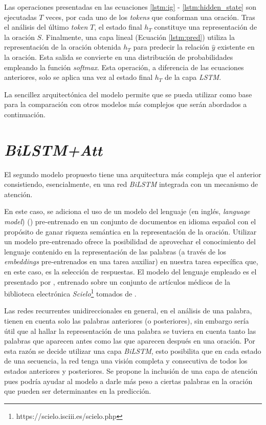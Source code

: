 Las operaciones presentadas en las ecuaciones \ref{lstm:ig} - \ref{lstm:hidden_state} son ejecutadas $T$ veces, por cada uno de los \textit{tokens} que conforman una oración. Tras el análisis del último \textit{token} $T$, el estado final $h_{T}$ constituye una representación de la oración $S$. Finalmente, una capa lineal (Ecuación \ref{lstm:pred}) utiliza la representación de la oración obtenida $h_{T}$ para predecir la relación $\hat{y}$ existente en la oración. Esta salida se convierte en una distribución de probabilidades empleando la función \textit{softmax}. Esta operación, a diferencia de las ecuaciones anteriores, solo se aplica una vez al estado final $h_{T}$ de la capa \textit{LSTM}.

La sencillez arquitectónica del modelo permite que se pueda utilizar como base para la comparación con otros modelos más complejos que serán abordados a continuación.

\section{\textit{BiLSTM+Att}}\label{bilstm_t}

El segundo modelo propuesto tiene una arquitectura más compleja que el anterior consistiendo, esencialmente, en una red \textit{BiLSTM} integrada con un mecanismo de atención.

En este caso, se adiciona el uso de un modelo del lenguaje (en inglés, \textit{language model})  (\cite{mikolov-2016-fastext}) pre-entrenado en un conjunto de documentos en idioma español con el propósito de ganar riqueza semántica en la representación de la oración. Utilizar un modelo pre-entrenado ofrece la posibilidad de aprovechar el conocimiento del lenguaje contenido en la representación de las palabras (a través de los \textit{embeddings} pre-entrenados en una tarea auxiliar) en nuestra tarea específica que, en este caso, es la selección de respuestas. El modelo del lenguaje empleado es el presentado por \cite{mikolov-2016-fastext}, entrenado sobre un conjunto de artículos médicos de la biblioteca electrónica \textit{Scielo}\footnote{https://scielo.isciii.es/scielo.php} tomados de \cite{2019-medical-fastext}.

Las redes recurrentes unidireccionales en general, en el análisis de una palabra, tienen en cuenta solo las palabras anteriores (o posteriores), sin embargo sería útil que al hallar la representación de una palabra se tuviera en cuenta tanto las palabras que aparecen antes como las que aparecen después en una oración. Por esta razón se decide utilizar una capa \textit{BiLSTM}, esto posibilita que en cada estado de una secuencia, la red tenga una visión completa y consecutiva de todos los estados anteriores y posteriores. Se propone la inclusión de una capa de atención pues podría ayudar al modelo a darle más peso a ciertas palabras en la oración que pueden ser determinantes en la predicción.


